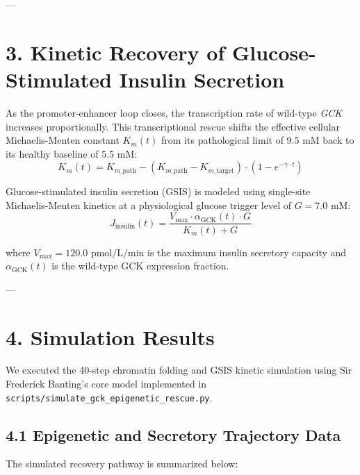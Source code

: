 \documentclass[11pt,twocolumn]{article}
\begin{document}
---

\section{3. Kinetic Recovery of Glucose-Stimulated Insulin Secretion}
As the promoter-enhancer loop closes, the transcription rate of wild-type \textit{GCK} increases proportionally. This transcriptional rescue shifts the effective cellular Michaelis-Menten constant $K_m(t)$ from its pathological limit of $9.5\text{ mM}$ back to its healthy baseline of $5.5\text{ mM}$:
$$K_m(t) = K_{m\_\text{path}} - \left(K_{m\_\text{path}} - K_{m\_\text{target}}\right) \cdot \left(1 - e^{-\gamma \cdot t}\right)$$

Glucose-stimulated insulin secretion (GSIS) is modeled using single-site Michaelis-Menten kinetics at a physiological glucose trigger level of $G = 7.0\text{ mM}$:
$$J_{\text{insulin}}(t) = \frac{V_{\text{max}} \cdot \alpha_{\text{GCK}}(t) \cdot G}{K_m(t) + G}$$

where $V_{\text{max}} = 120.0 \text{ pmol/L/min}$ is the maximum insulin secretory capacity and $\alpha_{\text{GCK}}(t)$ is the wild-type GCK expression fraction.

---

\section{4. Simulation Results}
We executed the 40-step chromatin folding and GSIS kinetic simulation using Sir Frederick Banting's core model implemented in \texttt{scripts/simulate_gck_epigenetic_rescue.py}.

\subsection{4.1 Epigenetic and Secretory Trajectory Data}
The simulated recovery pathway is summarized below:
\end{document}
